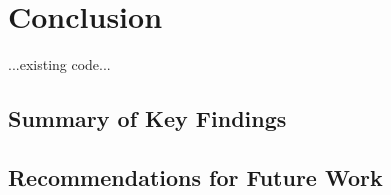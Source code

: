 
\chapter{Conclusion\label{chap:conclusion}}

...existing code...

\section{Summary of Key Findings}


\section{Recommendations for Future Work}

